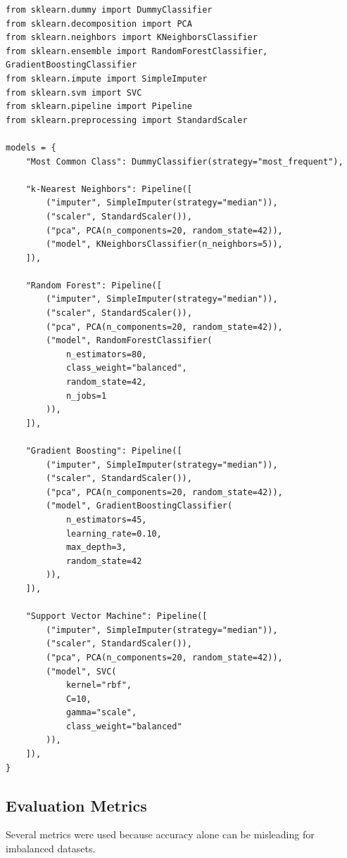 \documentclass[12pt,a4paper]{article}
\begin{document}
\begin{lstlisting}
from sklearn.dummy import DummyClassifier
from sklearn.decomposition import PCA
from sklearn.neighbors import KNeighborsClassifier
from sklearn.ensemble import RandomForestClassifier, GradientBoostingClassifier
from sklearn.impute import SimpleImputer
from sklearn.svm import SVC
from sklearn.pipeline import Pipeline
from sklearn.preprocessing import StandardScaler

models = {
    "Most Common Class": DummyClassifier(strategy="most_frequent"),

    "k-Nearest Neighbors": Pipeline([
        ("imputer", SimpleImputer(strategy="median")),
        ("scaler", StandardScaler()),
        ("pca", PCA(n_components=20, random_state=42)),
        ("model", KNeighborsClassifier(n_neighbors=5)),
    ]),

    "Random Forest": Pipeline([
        ("imputer", SimpleImputer(strategy="median")),
        ("scaler", StandardScaler()),
        ("pca", PCA(n_components=20, random_state=42)),
        ("model", RandomForestClassifier(
            n_estimators=80,
            class_weight="balanced",
            random_state=42,
            n_jobs=1
        )),
    ]),

    "Gradient Boosting": Pipeline([
        ("imputer", SimpleImputer(strategy="median")),
        ("scaler", StandardScaler()),
        ("pca", PCA(n_components=20, random_state=42)),
        ("model", GradientBoostingClassifier(
            n_estimators=45,
            learning_rate=0.10,
            max_depth=3,
            random_state=42
        )),
    ]),

    "Support Vector Machine": Pipeline([
        ("imputer", SimpleImputer(strategy="median")),
        ("scaler", StandardScaler()),
        ("pca", PCA(n_components=20, random_state=42)),
        ("model", SVC(
            kernel="rbf",
            C=10,
            gamma="scale",
            class_weight="balanced"
        )),
    ]),
}
\end{lstlisting}

\subsection{Evaluation Metrics}

Several metrics were used because accuracy alone can be misleading for imbalanced datasets.
\end{document}
